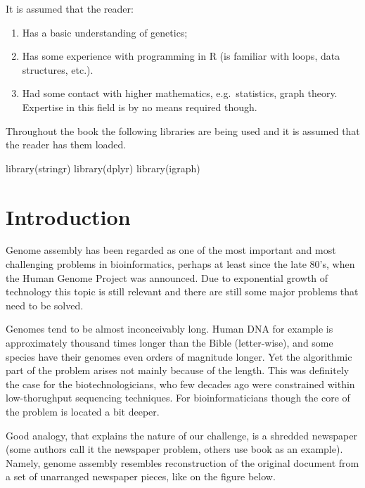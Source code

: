 \documentclass[
]{book}
\newenvironment{Shaded}{\begin{snugshade}}{\end{snugshade}}
\newcommand{\FunctionTok}[1]{\textcolor[rgb]{0.00,0.00,0.00}{#1}}
\newcommand{\NormalTok}[1]{#1}
\begin{document}
It is assumed that the reader:

\begin{enumerate}
\def\labelenumi{\arabic{enumi}.}
\item
  Has a basic understanding of genetics;
\item
  Has some experience with programming in R (is familiar with loops, data structures, etc.).
\item
  Had some contact with higher mathematics, e.g.~statistics, graph theory. Expertise in this field is by no means required though.
\end{enumerate}

Throughout the book the following libraries are being used and it is assumed that the reader has them loaded.

\begin{Shaded}
\begin{Highlighting}[]
\FunctionTok{library}\NormalTok{(stringr)}
\FunctionTok{library}\NormalTok{(dplyr)}
\FunctionTok{library}\NormalTok{(igraph)}
\end{Highlighting}
\end{Shaded}

\hypertarget{introduction}{%
\chapter{Introduction}\label{introduction}}

Genome assembly has been regarded as one of the most important and most challenging problems in bioinformatics, perhaps at least since the late 80's, when the Human Genome Project was announced. Due to exponential growth of technology this topic is still relevant and there are still some major problems that need to be solved.

Genomes tend to be almost inconceivably long. Human DNA for example is approximately thousand times longer than the Bible (letter-wise), and some species have their genomes even orders of magnitude longer. Yet the algorithmic part of the problem arises not mainly because of the length. This was definitely the case for the biotechnologicians, who few decades ago were constrained within low-thorughput sequencing techniques. For bioinformaticians though the core of the problem is located a bit deeper.

Good analogy, that explains the nature of our challenge, is a shredded newspaper (some authors call it the newspaper problem, others use book as an example). Namely, genome assembly resembles reconstruction of the original document from a set of unarranged newspaper pieces, like on the figure below.
\end{document}

